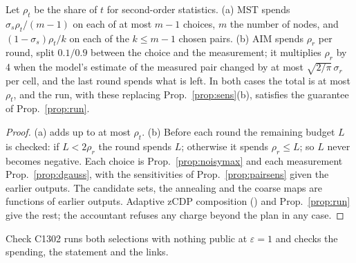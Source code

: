 \setcounter{proposition}{1301}
\begin{proposition}\label{prop:selrun}
Let $\rho_t$ be the share of $t$ for second-order statistics. (a) MST spends $\sigma_s\rho_t/(m-1)$ on each of at most $m-1$ choices, $m$ the number of nodes, and $(1-\sigma_s)\rho_t/k$ on each of the $k\le m-1$ chosen pairs. (b) AIM spends $\rho_r$ per round, split $0.1/0.9$ between the choice and the measurement; it multiplies $\rho_r$ by 4 when the model's estimate of the measured pair changed by at most $\sqrt{2/\pi}\,\sigma_r$ per cell, and the last round spends what is left. In both cases the total is at most $\rho_t$, and the run, with these replacing Prop.~\ref{prop:sens}(b), satisfies the guarantee of Prop.~\ref{prop:run}.
\end{proposition}
\begin{proof}
(a) adds up to at most $\rho_t$. (b) Before each round the remaining budget $L$ is checked: if $L<2\rho_r$ the round spends $L$; otherwise it spends $\rho_r\le L$; so $L$ never becomes negative. Each choice is Prop.~\ref{prop:noisymax} and each measurement Prop.~\ref{prop:dgauss}, with the sensitivities of Prop.~\ref{prop:pairsens} given the earlier outputs. The candidate sets, the annealing and the coarse maps are functions of earlier outputs. Adaptive zCDP composition (\cite{bun2016}) and Prop.~\ref{prop:run} give the rest; the accountant refuses any charge beyond the plan in any case.
\end{proof}
\noindent Check C1302 runs both selections with nothing public at $\varepsilon=1$ and checks the spending, the statement and the links.


